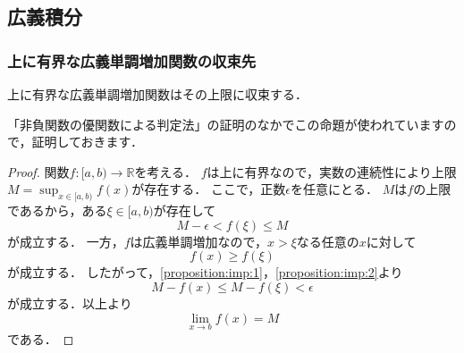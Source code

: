 \documentclass[./index]{subfiles}
\begin{document}
\setcounter{subsection}{6}
\subsection{広義積分}
\subsubsection{上に有界な広義単調増加関数の収束先}

\begin{screen}
    \begin{proposition}
        上に有界な広義単調増加関数はその上限に収束する．
    \end{proposition}
\end{screen}

「非負関数の優関数による判定法」の証明のなかでこの命題が使われていますので，証明しておきます．

\begin{proof}
    関数$f: [a, b) \rightarrow \mathbb{R}$を考える．
    $f$は上に有界なので，実数の連続性により上限$M = \sup_{x \in [a, b)} f(x)$が存在する．
    ここで，正数$\epsilon$を任意にとる．
    $M$は$f$の上限であるから，ある$\xi \in [a, b)$が存在して
    \begin{equation}
        \label{proposition:imp:1}
        M - \epsilon < f(\xi) \le M
    \end{equation}
    が成立する．
    一方，$f$は広義単調増加なので，$x > \xi$なる任意の$x$に対して
    \begin{equation}
        \label{proposition:imp:2}
        f(x) \ge f(\xi)
    \end{equation}
    が成立する．
    したがって，\cref{proposition:imp:1}，\cref{proposition:imp:2}より
    \begin{equation}
        M - f(x) \le M - f(\xi) < \epsilon
    \end{equation}
    が成立する．以上より
    \begin{equation}
        \lim_{x \rightarrow b} f(x) = M
    \end{equation}
    である．
\end{proof}
\end{document}
